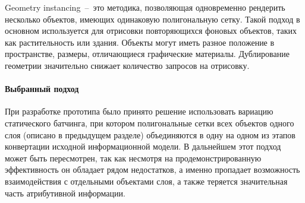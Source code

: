 \begin{enumerate}
{        Geometry instancing~--~это методика, позволяющая
        одновременно рендерить нес\-колько объектов, имеющих
        одинаковую полигональную сетку.
        Такой подход в основном используется для отрисовки
        повторяющихся фоновых объектов, таких как растительность или здания.
        Объекты могут иметь разное положение в пространстве,
        размеры, отличающиеся графические материалы.
        Дублирование геометрии значительно снижает
        количество запросов на отрисовку.
    }
\end{enumerate}

\paragraph{Выбранный подход}

При разработке прототипа было принято решение
использовать вариацию статического батчинга,
при котором полигональные сетки всех объектов одного слоя
(описано в предыдущем разделе)
объединяются в одну на одном из этапов конвертации
исходной информационной модели.
В дальнейшем этот подход может быть пересмотрен,
так как несмотря на продемонстрированную эффективность
он обладает рядом недостатков,
а именно пропадает возможность взаимодействия с
отдельными объектами слоя, а также
теряется значительная часть атрибутивной информации.

